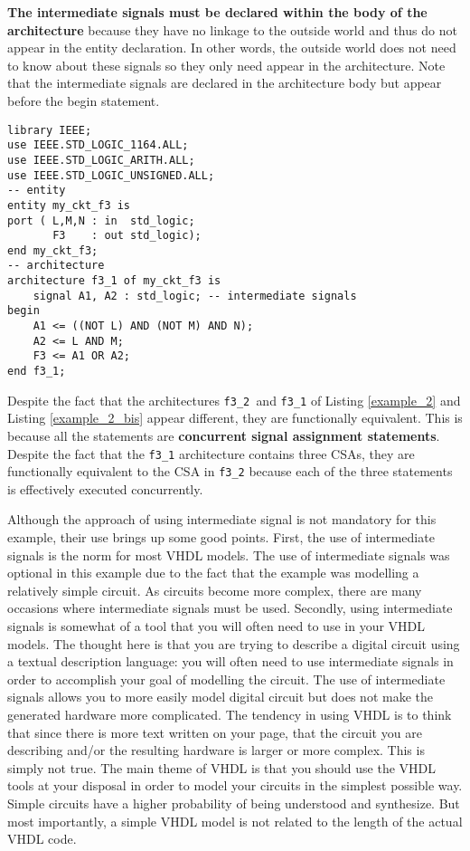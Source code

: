 \textbf{The intermediate signals must be declared within the body of the architecture} because they have no linkage to the outside world and thus do not appear in the entity declaration. In other words, the outside world does not need to know about these signals so they only need appear in the architecture. Note that the intermediate signals are declared in the architecture body but appear before the begin statement.
\null\newpage
\begin{lstlisting}[label=example_2_bis, caption=Alternative solution of example 2.]
library IEEE;
use IEEE.STD_LOGIC_1164.ALL;
use IEEE.STD_LOGIC_ARITH.ALL;
use IEEE.STD_LOGIC_UNSIGNED.ALL;
-- entity
entity my_ckt_f3 is
port ( L,M,N : in  std_logic;
       F3    : out std_logic);
end my_ckt_f3;
-- architecture
architecture f3_1 of my_ckt_f3 is
	signal A1, A2 : std_logic; -- intermediate signals
begin
	A1 <= ((NOT L) AND (NOT M) AND N);
	A2 <= L AND M;
	F3 <= A1 OR A2;
end f3_1;
\end{lstlisting}

Despite the fact that the architectures \texttt{f3\_2 }and \texttt{f3\_1} of Listing \ref{example_2} and Listing \ref{example_2_bis} appear different, they are functionally equivalent. This is because all the statements are \textbf{concurrent signal assignment statements}. Despite the fact that the \texttt{f3\_1} architecture contains three CSAs, they are functionally equivalent to the CSA in \texttt{f3\_2} because each of the three statements is effectively executed concurrently.

Although the approach of using intermediate signal is not mandatory for this example, their use brings up some good points. First, the use of intermediate signals is the norm for most VHDL models. The use of intermediate signals was optional in this example due to the fact that the example was modelling a relatively simple circuit. As circuits become more complex, there are many occasions where intermediate signals must be used. Secondly, using intermediate signals is somewhat of a tool that you will often need to use in your VHDL models. The thought here is that you are trying to describe a digital circuit using a textual description language: you will often need to use intermediate signals in order to accomplish your goal of modelling the circuit. The use of intermediate signals allows you to more easily model digital circuit but does not make the generated hardware more complicated. The tendency in using VHDL is to think that since there is more text written on your page, that the circuit you are describing and/or the resulting hardware is larger or more complex. This is simply not true. The main theme of VHDL is that you should use the VHDL tools at your disposal in order to model your circuits in the simplest possible way. Simple circuits have a higher probability of being understood and synthesize. But most importantly, a simple VHDL model is not related to the length of the actual VHDL code.

